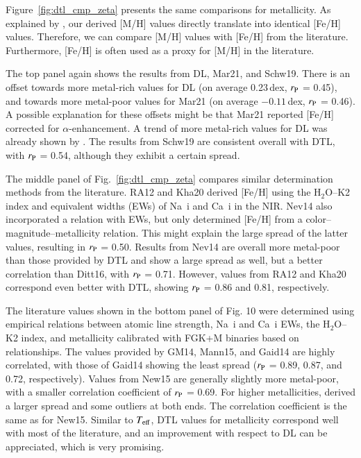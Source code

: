 \documentclass{aa}
\begin{document}
Figure~\ref{fig:dtl_cmp_zeta} presents the same comparisons for metallicity. As explained by \cite{Passegger2020}, our derived [M/H] values directly translate into identical [Fe/H] values. Therefore, we can compare [M/H] values with [Fe/H] from the literature. Furthermore, [Fe/H] is often used as a proxy for [M/H] in the literature.

The top panel again shows the results from DL, Mar21, and Schw19. There is an offset towards more metal-rich values for DL (on average 0.23\,dex, $r_{\rm P}$ = 0.45), and towards more metal-poor values for Mar21 (on average $-0.11$\,dex, $r_{\rm P}$ = 0.46). A possible explanation for these offsets might be that Mar21 reported [Fe/H] corrected for $\alpha$-enhancement. A trend of more metal-rich values for DL was already shown by \cite{Passegger2020,Passegger2022}. The results from Schw19 are consistent overall with DTL, with $r_{\rm P}$ = 0.54, although they exhibit a certain spread.

The middle panel of Fig.~\ref{fig:dtl_cmp_zeta} compares similar determination methods from the literature. RA12 and Kha20 derived [Fe/H] using the H$_{2}$O--K2 index and equivalent widths (EWs) of Na~{\sc i} and Ca~{\sc i} in the NIR. Nev14 also incorporated a relation with EWs, but only \citet[][Ditt16]{Dittmann2016} determined [Fe/H] from a color--magnitude--metallicity relation. This might explain the large spread of the latter values, {resulting in} $r_{\rm P}$ = 0.50. Results from Nev14 are overall more metal-poor than those provided by DTL and show a large spread as well, but a better correlation than Ditt16, with $r_{\rm P}$ = 0.71. However, values from RA12 and Kha20 correspond even better with DTL, showing $r_{\rm P}$ = 0.86 and 0.81, respectively.

The literature values shown in the bottom panel of Fig. 10 were determined using empirical relations between atomic line strength, Na~{\sc i} and Ca~{\sc i} EWs, the H$_{2}$O--K2 index, and metallicity calibrated with FGK+M binaries based on \cite{Mann2013a,Mann2013b,Mann2014} relationships. The values provided by GM14, Mann15, and Gaid14 are highly correlated, with those of Gaid14 showing the least spread ($r_{\rm P}$ = 0.89, 0.87, and 0.72, respectively). {Values from} New15 are generally slightly more metal-poor, with a smaller correlation coefficient of $r_{\rm P}$ = 0.69. For higher metallicities, \citet[][Ter15]{Terrien2015} {derived} a larger spread and some outliers at both ends. The correlation coefficient is the same as for New15.
Similar to $T_{\rm eff}$, DTL values for metallicity correspond well with most of the literature, and an improvement with respect to DL can be appreciated, which is very promising.
\end{document}
